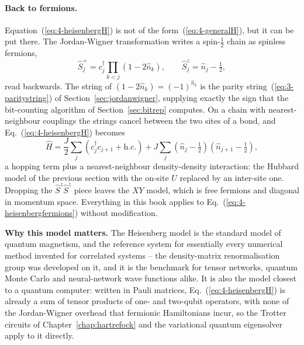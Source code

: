 \paragraph{Back to fermions.}
Equation~(\ref{eq:4-heisenbergH}) is not of the
form~(\ref{eq:4-generalH}), but it can be put there.  The Jordan-Wigner
transformation writes a spin-$\tfrac12$ chain as spinless fermions,
\begin{equation}
  \hat{S}^+_j = c^{\dagger}_j\prod_{k<j}\left(1-2\hat{n}_k\right),
  \qquad
  \hat{S}^z_j = \hat{n}_j - \tfrac12,
  \label{eq:4-jordanwigner}
\end{equation}
read backwards.  The string of $(1-2\hat{n}_k)=(-1)^{\hat{n}_k}$ is the
parity string~(\ref{eq:3-paritystring}) of
Section~\ref{sec:jordanwigner}, supplying exactly the sign that the
bit-counting algorithm of Section~\ref{sec:bitrep} computes.  On a
chain with nearest-neighbour couplings the strings cancel between the two
sites of a bond, and Eq.~(\ref{eq:4-heisenbergH}) becomes
\begin{equation}
  \hat{H} = \frac{J}{2}\sum_j
      \left(c^{\dagger}_jc_{j+1}+\mathrm{h.c.}\right)
    + J\sum_j
      \left(\hat{n}_j-\tfrac12\right)\left(\hat{n}_{j+1}-\tfrac12\right),
  \label{eq:4-heisenbergfermions}
\end{equation}
a hopping term plus a nearest-neighbour density-density interaction: the
Hubbard model of the previous section with the on-site $U$ replaced by an
inter-site one.  Dropping the $\hat{S}^z\hat{S}^z$ piece leaves the $XY$
model, which is free fermions and diagonal in momentum space.  Everything in
this book applies to Eq.~(\ref{eq:4-heisenbergfermions}) without
modification.

\begin{notebox}
\textbf{Why this model matters.} The Heisenberg model is the standard model of
quantum magnetism, and the reference system for essentially every numerical
method invented for correlated systems -- the density-matrix renormalisation
group was developed on it, and it is the benchmark for tensor networks,
quantum Monte Carlo and neural-network wave functions alike.  It is also the
model closest to a quantum computer: written in Pauli matrices,
Eq.~(\ref{eq:4-heisenbergH}) is already a sum of tensor products of
one- and two-qubit operators, with none of the Jordan-Wigner overhead that
fermionic Hamiltonians incur, so the Trotter circuits of
Chapter~\ref{chap:hartrefock} and the variational quantum eigensolver apply to
it directly.
\end{notebox}

